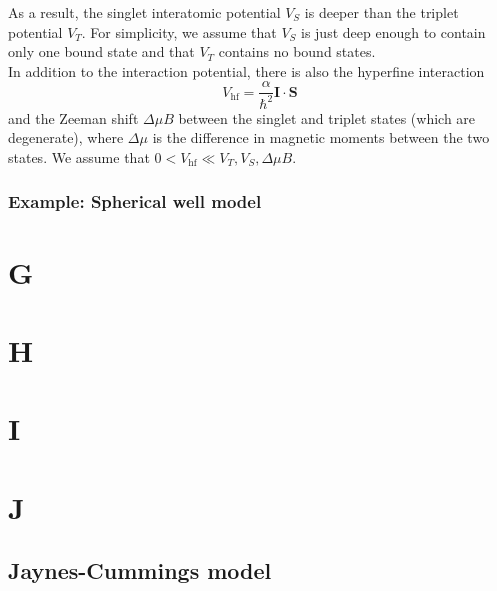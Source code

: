 \documentclass{book}
\theoremstyle{definition}
\newcommand{\al}{\alpha}
\newcommand{\f}[2]{\frac{#1}{#2}}
\begin{document}
As a result, the singlet interatomic potential $V_S$ is deeper than the triplet potential $V_T$. For simplicity, we assume that $V_S$ is just deep enough to contain only one bound state and that $V_T$ contains no bound states.\\


In addition to the interaction potential, there is also the hyperfine interaction
\begin{equation*}
V_\text{hf} = \f{\al}{\hbar^2} \mathbf{I}\cdot \mathbf{S}
\end{equation*}
and the Zeeman shift $\Delta \mu B$ between the singlet and triplet states (which are degenerate), where $\Delta \mu$ is the difference in magnetic moments between the two states. We assume that $0< V_\text{hf} \ll V_T,V_S,\Delta \mu B$. 


\subsection*{Example: Spherical well model}









\chapter*{G}
\chapter*{H}
\chapter*{I}
\chapter*{J}


\section*{Jaynes-Cummings model}

\end{document}
